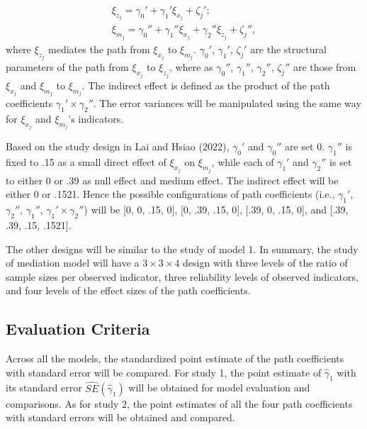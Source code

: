 \documentclass[
  man]{apa6}
\begin{document}
\begin{equation}
\begin{gathered}
\xi_{z_{j}} =  \gamma_{0}' +  \gamma_{1}'\xi_{x_{j}} + \zeta_{j}';\\
\xi_{m_{j}} = \gamma_{0}'' + \gamma_{1}''\xi_{x_{j}} + \gamma_{2}''\xi_{z_{j}} + \zeta_{j}'',
\end{gathered}
\end{equation}
where \(\xi_{z_{j}}\) mediates the path from \(\xi_{x_{j}}\) to \(\xi_{m_{j}}\). \(\gamma_{0}'\), \(\gamma_{1}'\), \(\zeta_{j}'\) are the structural parameters of the path from \(\xi_{x_{j}}\) to \(\xi_{z_{j}}\), where as \(\gamma_{0}''\), \(\gamma_{1}''\), \(\gamma_{2}''\), \(\zeta_{j}''\) are those from \(\xi_{x_{j}}\) and \(\xi_{m_{j}}\) to \(\xi_{m_{j}}\). The indirect effect is defined as the product of the path coefficients \(\gamma_{1}' \times \gamma_{2}''\). The error variances will be manipulated using the same way for \(\xi_{x_{j}}\) and \(\xi_{m_{j}}\)'s indicators.

Based on the study design in Lai and Hsiao (2022), \(\gamma_{0}'\) and \(\gamma_{0}''\) are set 0. \(\gamma_{1}''\) is fixed to .15 as a small direct effect of \(\xi_{x_{j}}\) on \(\xi_{m_{j}}\), while each of \(\gamma_{1}'\) and \(\gamma_{2}''\) is set to either 0 or .39 as null effect and medium effect. The indirect effect will be either 0 or .1521. Hence the possible configurations of path coefficients (i.e., \(\gamma_{1}'\), \(\gamma_{2}''\), \(\gamma_{1}''\), \(\gamma_{1}' \times \gamma_{2}''\)) will be {[}0, 0, .15, 0{]}, {[}0, .39, .15, 0{]}, {[}.39, 0, .15, 0{]}, and {[}.39, .39, .15, .1521{]}.

The other designs will be similar to the study of model 1. In summary, the study of mediation model will have a \(3 \times 3 \times 4\) design with three levels of the ratio of sample sizes per observed indicator, three reliability levels of observed indicators, and four levels of the effect sizes of the path coefficients.

\hypertarget{evaluation-criteria-1}{%
\subsection{Evaluation Criteria}\label{evaluation-criteria-1}}

Across all the models, the standardized point estimate of the path coefficients with standard error will be compared. For study 1, the point estimate of \(\hat{\gamma}_{1}\) with its standard error \(\hat{SE}(\hat{\gamma}_{1})\) will be obtained for model evaluation and comparisons. As for study 2, the point estimates of all the four path coefficients with standard errors will be obtained and compared.
\end{document}
